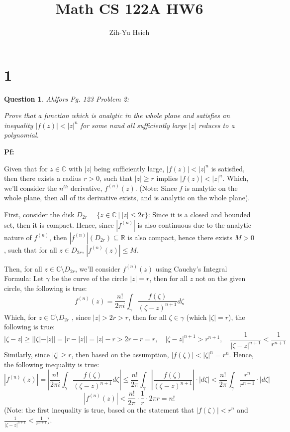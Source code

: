 \documentclass{article}
\title{Math CS 122A HW6}
\author{Zih-Yu Hsieh}
\newtheorem{question}{Question}
\begin{document}
\maketitle

\section*{1}
\begin{myBox}[]{}
    \begin{question}
        Ahlfors Pg. 123 Problem 2:

        Prove that a function which is analytic in the whole plane and
        satisfies an inequality $|f(z)| < |z|^n$ for some nand all sufficiently large $|z|$
        reduces to a polynomial.
    \end{question}
\end{myBox}

\textbf{Pf:}

Given that for $z\in\mathbb{C}$ with $|z|$ being sufficiently large, $|f(z)|< |z|^n$ is satisfied, 
then there exists a radius $r>0$, such that $|z|\geq r$ implies $|f(z)|<|z|^n$. Which, we'll consider the $n^{th}$ derivative,
$f^{(n)}(z)$. (Note: Since $f$ is analytic on the whole plane, then all of its derivative exists, and is analytic on the whole plane).

\hfill

First, consider the disk $D_{2r} = \{z\in\mathbb{C}\ |\ |z|\leq 2r\}$: Since it is a closed and bounded set,
then it is compact. Hence, since $|f^{(n)}|$ is also continuous due to the analytic nature of $f^{(n)}$, 
then $|f^{(n)}|(D_{2r}) \subseteq \mathbb{R}$ is also compact, hence there exists $M>0$, such that for all $z\in D_{2r}$,
$|f^{(n)}(z)| \leq M$.

\hfill

Then, for all $z\in \mathbb{C}\setminus D_{2r}$, we'll consider $f^{(n)}(z)$ using Cauchy's Integral Formula:
Let $\gamma$ be the curve of the circle $|z|=r$, then for all $z$ not on the given circle, the following is true:
$$f^{(n)}(z) = \frac{n!}{2\pi i}\int_{\gamma}\frac{f(\zeta)}{(\zeta-z)^{n+1}}d\zeta$$
Which, for $z\in \mathbb{C}\setminus D_{2r}$ , since $|z| > 2r > r$, then for all $\zeta \in \gamma$ (which $|\zeta|=r$), the following is true:
$$|\zeta-z| \geq ||\zeta|-|z|| = |r-|z|| = |z|-r > 2r-r = r,\quad |\zeta-z|^{n+1}> r^{n+1},\quad \frac{1}{|\zeta-z|^{n+1}} < \frac{1}{r^{n+1}}$$
Similarly, since $|\zeta|\geq r$, then based on the assumption, $|f(\zeta)| < |\zeta|^n = r^n$.
Hence, the following inequality is true:
$$|f^{(n)}(z)| = \left|\frac{n!}{2\pi i}\int_{\gamma}\frac{f(\zeta)}{(\zeta-z)^{n+1}}d\zeta\right| \leq \frac{n!}{2\pi}\int_{\gamma}\left|\frac{f(\zeta)}{(\zeta-z)^{n+1}}\right|\cdot|d\zeta| < \frac{n!}{2\pi}\int_{\gamma}\frac{r^n}{r^{n+1}}\cdot|d\zeta|$$
$$|f^{(n)}(z)| < \frac{n!}{2\pi}\cdot\frac{1}{r}\cdot 2\pi r = n!$$
(Note: the first inequality is true, based on the statement that $|f(\zeta)|< r^n$ and $\frac{1}{|\zeta-z|^{n+1}}<\frac{1}{r^{n+1}}$).
\end{document}

